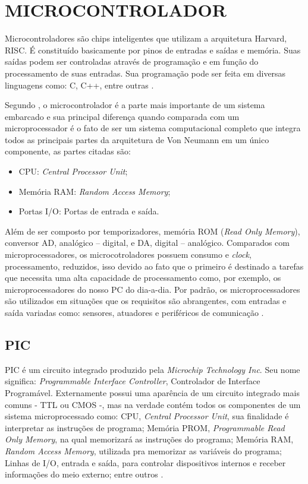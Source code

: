\section{MICROCONTROLADOR}
Microcontroladores são chips inteligentes que utilizam a arquitetura Harvard, RISC. É constituído basicamente por pinos de entradas e saídas e memória. Suas saídas podem ser controladas através de programação e em função do processamento de suas entradas. Sua programação pode ser feita em diversas linguagens como: C, C++, entre outras \cite{radio2012amadores}.

Segundo \cite{ganssle1999art}, o microcontrolador é a parte mais importante de um sistema embarcado e sua principal diferença quando comparada com um microprocessador é o fato de ser um sistema computacional completo que integra todos as principais partes da arquitetura de Von Neumann em um único componente, as partes citadas são:
\begin{itemize}
\item CPU: \emph{Central Processor Unit};
\item Memória RAM: \emph{Random Access Memory};
\item Portas I/O: Portas de entrada e saída.
\end{itemize}

Além de ser composto por temporizadores, memória ROM (\emph{Read Only Memory}), conversor AD, analógico – digital, e DA, digital – analógico.
Comparados com microprocessadores, os microcotroladores possuem consumo e \emph{clock}, processamento, reduzidos, isso devido ao fato que o primeiro é destinado a tarefas que necessita uma alta capacidade de processamento como, por exemplo, os microprocessadores do nosso PC do dia-a-dia. Por padrão, os microprocessadores são utilizados em situações que os requisitos são abrangentes, com entradas e saída variadas como: sensores, atuadores e periféricos de comunicação \cite{lee2011introduction}.

\subsection{PIC}
PIC é um circuito integrado produzido pela \emph{Microchip Technology Inc}. Seu nome significa: \emph{Programmable Interface Controller}, Controlador de Interface Programável. Externamente possui uma aparência de um circuito integrado mais comuns - TTL ou CMOS -, mas na verdade contém todos os componentes de um sistema microprocessado como: CPU, \emph{Central Processor Unit}, sua finalidade é interpretar as instruções de programa; Memória PROM, \emph{Programmable Read Only Memory}, na qual memorizará as instruções do programa; Memória RAM, \emph{Random Access Memory}, utilizada pra memorizar as variáveis do programa; Linhas de I/O, entrada e saída, para controlar dispositivos internos e receber informações do meio externo; entre outros \cite{radio2012amadores,wikipedia2012pic}.

